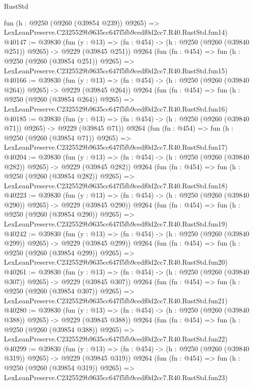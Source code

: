 \begin{lexlean}{RustStd}
\begin{coremodule}
    fun (h : @9250 (@9260 (@39854 @239)) @9265) =>
    LexLeanPreserve.C2325529b9635cc647f5fb9cedf0d2cc7.R40.RustStd.fun14)
@40147 := @39830
    (fun (y : @13) => (fn : @454) -> (h : @9250 (@9260 (@39840 @251)) @9265) -> @9229 (@39845 @251))
    @9264
    (fun (fn : @454) =>
    fun (h : @9250 (@9260 (@39854 @251)) @9265) =>
    LexLeanPreserve.C2325529b9635cc647f5fb9cedf0d2cc7.R40.RustStd.fun15)
@40166 := @39830
    (fun (y : @13) => (fn : @454) -> (h : @9250 (@9260 (@39840 @264)) @9265) -> @9229 (@39845 @264))
    @9264
    (fun (fn : @454) =>
    fun (h : @9250 (@9260 (@39854 @264)) @9265) =>
    LexLeanPreserve.C2325529b9635cc647f5fb9cedf0d2cc7.R40.RustStd.fun16)
@40185 := @39830
    (fun (y : @13) => (fn : @454) -> (h : @9250 (@9260 (@39840 @71)) @9265) -> @9229 (@39845 @71))
    @9264
    (fun (fn : @454) =>
    fun (h : @9250 (@9260 (@39854 @71)) @9265) =>
    LexLeanPreserve.C2325529b9635cc647f5fb9cedf0d2cc7.R40.RustStd.fun17)
@40204 := @39830
    (fun (y : @13) => (fn : @454) -> (h : @9250 (@9260 (@39840 @282)) @9265) -> @9229 (@39845 @282))
    @9264
    (fun (fn : @454) =>
    fun (h : @9250 (@9260 (@39854 @282)) @9265) =>
    LexLeanPreserve.C2325529b9635cc647f5fb9cedf0d2cc7.R40.RustStd.fun18)
@40223 := @39830
    (fun (y : @13) => (fn : @454) -> (h : @9250 (@9260 (@39840 @290)) @9265) -> @9229 (@39845 @290))
    @9264
    (fun (fn : @454) =>
    fun (h : @9250 (@9260 (@39854 @290)) @9265) =>
    LexLeanPreserve.C2325529b9635cc647f5fb9cedf0d2cc7.R40.RustStd.fun19)
@40242 := @39830
    (fun (y : @13) => (fn : @454) -> (h : @9250 (@9260 (@39840 @299)) @9265) -> @9229 (@39845 @299))
    @9264
    (fun (fn : @454) =>
    fun (h : @9250 (@9260 (@39854 @299)) @9265) =>
    LexLeanPreserve.C2325529b9635cc647f5fb9cedf0d2cc7.R40.RustStd.fun20)
@40261 := @39830
    (fun (y : @13) => (fn : @454) -> (h : @9250 (@9260 (@39840 @307)) @9265) -> @9229 (@39845 @307))
    @9264
    (fun (fn : @454) =>
    fun (h : @9250 (@9260 (@39854 @307)) @9265) =>
    LexLeanPreserve.C2325529b9635cc647f5fb9cedf0d2cc7.R40.RustStd.fun21)
@40280 := @39830
    (fun (y : @13) => (fn : @454) -> (h : @9250 (@9260 (@39840 @388)) @9265) -> @9229 (@39845 @388))
    @9264
    (fun (fn : @454) =>
    fun (h : @9250 (@9260 (@39854 @388)) @9265) =>
    LexLeanPreserve.C2325529b9635cc647f5fb9cedf0d2cc7.R40.RustStd.fun22)
@40299 := @39830
    (fun (y : @13) => (fn : @454) -> (h : @9250 (@9260 (@39840 @319)) @9265) -> @9229 (@39845 @319))
    @9264
    (fun (fn : @454) =>
    fun (h : @9250 (@9260 (@39854 @319)) @9265) =>
    LexLeanPreserve.C2325529b9635cc647f5fb9cedf0d2cc7.R40.RustStd.fun23)

\end{coremodule}
\end{lexlean}

